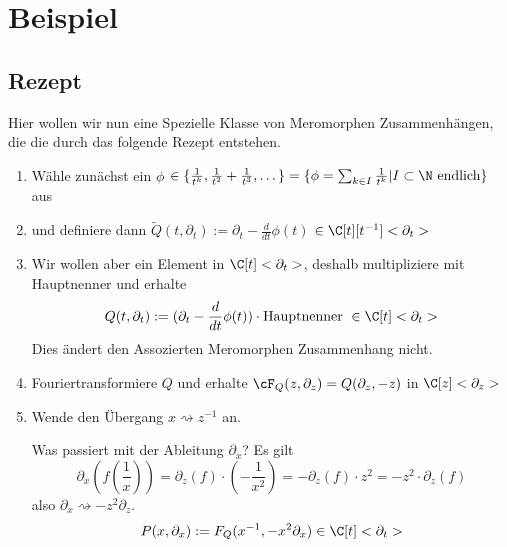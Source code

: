 \chapter{Beispiel}

\section{Rezept} \label{sec:allgemeinProblem}

\begin{comment}
siehe: \cite[5.b]{sabbah_Fourier-local}

bzeug zu $\sE^\phi$??
\end{comment}

\begin{comment}
sei $\phi\in\{\frac{1}{t^k},\frac{1}{t^2}+\frac{1}{t^3},\dots\}$
\begin{enumerate}
\item Starte mit: $P(t,\partial_t):=(\partial_t-\frac{d}{dt}\phi(t)) \cdot
\mbox{Hauptnenner }\in\C[t]<\partial_t>$
\item Furiertrafo: $F_P(z,\partial_z)=P(\partial_z,-z)\in\C[z]<\partial_z>$
\item $x=z^{-1}$ und $\partial_x=-z^2\partial_z$ \\
\[
Q(x,\partial_x):=F_P(x^{-1},-x^2\partial_x)\cdot \mbox{Hauptnenner
}\in\C[x]<\partial_x>
\]

\textbf{Hauptnenner unnötig?!?}
\item Berechne für $Q$ das NP usw...
\end{enumerate}
\end{comment}

Hier wollen wir nun eine Spezielle Klasse von Meromorphen Zusammenhängen, die
die durch das folgende Rezept entstehen.
\begin{enumerate}
\item Wähle zunächst ein $\phi$
$\in\{\frac{1}{t^k},\frac{1}{t^2}+\frac{1}{t^3},\dots\}
=\{\phi=\sum_{k\in I}\frac{1}{t^{k}}|I\subset\N\mbox{ endlich}\}$ aus
\item und definiere dann
$ \tilde Q(t,\partial_t):=\partial_t-\frac{d}{dt}\phi(t)$
$\in\C[t][t^{-1}]<\partial_t>$
\item Wir wollen aber ein Element in $\C[t]<\partial_t>$,
deshalb multipliziere mit Hauptnenner und erhalte
\[
Q(t,\partial_t):=(\partial_t-\frac{d}{dt}\phi(t)) \cdot
\mbox{Hauptnenner }\in\C[t]<\partial_t>
\]
Dies ändert den Assozierten Meromorphen Zusammenhang nicht.
\begin{comment}
Lemma?
\end{comment}
\item Fouriertransformiere $Q$ und erhalte
$\cF_Q(z,\partial_z)=Q(\partial_z,-z)$ in $\C[z]<\partial_z>$
\item Wende den Übergang $x\rightsquigarrow z^{-1}$ an.

Was passiert mit der Ableitung $\partial_x$? Es gilt
\[
\partial_x (f(\frac{1}{x}))=
\partial_z(f)\cdot (-\frac{1}{x^2})=
-\partial_z(f)\cdot z^2= %
- z^2 \cdot \partial_z(f)
\]
also $ \partial_x\rightsquigarrow-z^2\partial_z $.
\[
P(x,\partial_x):=F_Q(x^{-1},-x^2\partial_x) \in \C[t]<\partial_t>
\]
\end{enumerate}

